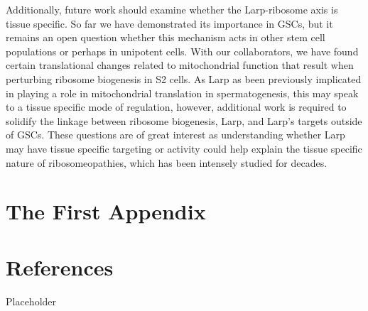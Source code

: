 \documentclass[12pt,oneside]{reedthesis}
\begin{document}
Additionally, future work should examine whether the Larp-ribosome axis is tissue specific. So far we have demonstrated its importance in GSCs, but it remains an open question whether this mechanism acts in other stem cell populations or perhaps in unipotent cells. With our collaborators, we have found certain translational changes related to mitochondrial function that result when perturbing ribosome biogenesis in S2 cells. As Larp as been previously implicated in playing a role in mitochondrial translation in spermatogenesis, this may speak to a tissue specific mode of regulation, however, additional work is required to solidify the linkage between ribosome biogenesis, Larp, and Larp's targets outside of GSCs. These questions are of great interest as understanding whether Larp may have tissue specific targeting or activity could help explain the tissue specific nature of ribosomeopathies, which has been intensely studied for decades.

\appendix

\hypertarget{the-first-appendix}{%
\chapter{The First Appendix}\label{the-first-appendix}}

\hypertarget{references}{%
\chapter*{References}\label{references}}

Placeholder
\end{document}

